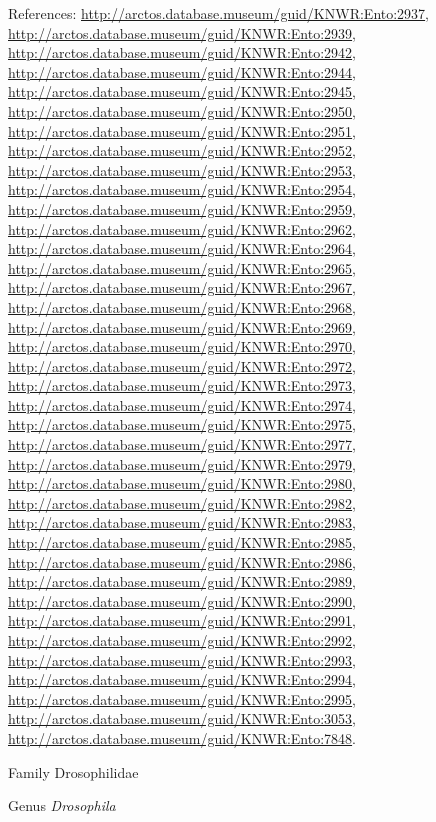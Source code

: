 \documentclass[9pt, article]{memoir}
\begin{document}
\begin{multicols}{2}
\vspace{6pt}References: 
\url{http://arctos.database.museum/guid/KNWR:Ento:2937}, 
\url{http://arctos.database.museum/guid/KNWR:Ento:2939}, 
\url{http://arctos.database.museum/guid/KNWR:Ento:2942}, 
\url{http://arctos.database.museum/guid/KNWR:Ento:2944}, 
\url{http://arctos.database.museum/guid/KNWR:Ento:2945}, 
\url{http://arctos.database.museum/guid/KNWR:Ento:2950}, 
\url{http://arctos.database.museum/guid/KNWR:Ento:2951}, 
\url{http://arctos.database.museum/guid/KNWR:Ento:2952}, 
\url{http://arctos.database.museum/guid/KNWR:Ento:2953}, 
\url{http://arctos.database.museum/guid/KNWR:Ento:2954}, 
\url{http://arctos.database.museum/guid/KNWR:Ento:2959}, 
\url{http://arctos.database.museum/guid/KNWR:Ento:2962}, 
\url{http://arctos.database.museum/guid/KNWR:Ento:2964}, 
\url{http://arctos.database.museum/guid/KNWR:Ento:2965}, 
\url{http://arctos.database.museum/guid/KNWR:Ento:2967}, 
\url{http://arctos.database.museum/guid/KNWR:Ento:2968}, 
\url{http://arctos.database.museum/guid/KNWR:Ento:2969}, 
\url{http://arctos.database.museum/guid/KNWR:Ento:2970}, 
\url{http://arctos.database.museum/guid/KNWR:Ento:2972}, 
\url{http://arctos.database.museum/guid/KNWR:Ento:2973}, 
\url{http://arctos.database.museum/guid/KNWR:Ento:2974}, 
\url{http://arctos.database.museum/guid/KNWR:Ento:2975}, 
\url{http://arctos.database.museum/guid/KNWR:Ento:2977}, 
\url{http://arctos.database.museum/guid/KNWR:Ento:2979}, 
\url{http://arctos.database.museum/guid/KNWR:Ento:2980}, 
\url{http://arctos.database.museum/guid/KNWR:Ento:2982}, 
\url{http://arctos.database.museum/guid/KNWR:Ento:2983}, 
\url{http://arctos.database.museum/guid/KNWR:Ento:2985}, 
\url{http://arctos.database.museum/guid/KNWR:Ento:2986}, 
\url{http://arctos.database.museum/guid/KNWR:Ento:2989}, 
\url{http://arctos.database.museum/guid/KNWR:Ento:2990}, 
\url{http://arctos.database.museum/guid/KNWR:Ento:2991}, 
\url{http://arctos.database.museum/guid/KNWR:Ento:2992}, 
\url{http://arctos.database.museum/guid/KNWR:Ento:2993}, 
\url{http://arctos.database.museum/guid/KNWR:Ento:2994}, 
\url{http://arctos.database.museum/guid/KNWR:Ento:2995}, 
\url{http://arctos.database.museum/guid/KNWR:Ento:3053}, 
\url{http://arctos.database.museum/guid/KNWR:Ento:7848}.

\vspace{6pt}\noindent\hspace{24pt}Family Drosophilidae


\vspace{6pt}\noindent\hspace{30pt}Genus \textit{Drosophila}



\end{multicols}
\end{document}
